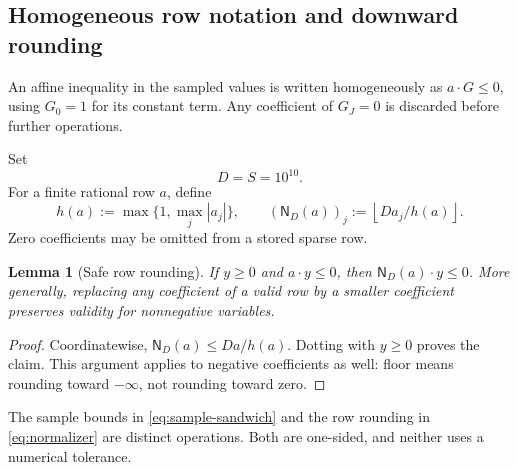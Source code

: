 \documentclass[11pt]{article}
\numberwithin{equation}{section}
\newtheorem{lemma}[theorem]{Lemma}
\theoremstyle{definition}
\newcommand{\fl}[1]{\left\lfloor#1\right\rfloor}
\newcommand{\normrow}{\mathsf N_D}
\begin{document}
\subsection{Homogeneous row notation and downward rounding}
An affine inequality in the sampled values is written homogeneously as
$a\cdot G\le0$, using $G_0=1$ for its constant term. Any coefficient of
$G_J=0$ is discarded before further operations.

Set
\begin{equation}\label{eq:DS}
 D=S=10^{10}.
\end{equation}
For a finite rational row $a$, define
\begin{equation}\label{eq:normalizer}
 h(a):=\max\{1,\max_j|a_j|\},\qquad
 (\normrow(a))_j:=\fl{D a_j/h(a)}.
\end{equation}
Zero coefficients may be omitted from a stored sparse row.

\begin{lemma}[Safe row rounding]\label{lem:floor}
If $y\ge0$ and $a\cdot y\le0$, then
$\normrow(a)\cdot y\le0$. More generally, replacing any coefficient of a
valid row by a smaller coefficient preserves validity for nonnegative
variables.
\end{lemma}
\begin{proof}
Coordinatewise, $\normrow(a)\le Da/h(a)$. Dotting with $y\ge0$ proves the
claim. This argument applies to negative coefficients as well: floor means
rounding toward $-\infty$, not rounding toward zero.
\end{proof}

The sample bounds in \eqref{eq:sample-sandwich} and the row rounding in
\eqref{eq:normalizer} are distinct operations. Both are one-sided, and neither
uses a numerical tolerance.
\end{document}
